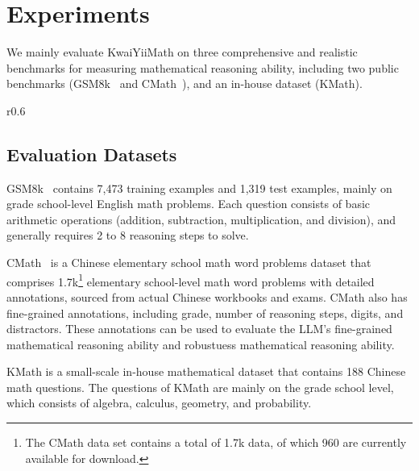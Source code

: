 \documentclass{article}
\begin{document}
\section{Experiments}
We mainly evaluate KwaiYiiMath on three comprehensive and realistic benchmarks for measuring mathematical reasoning ability, including two public benchmarks (GSM8k~\cite{cobbe2021training} and CMath~\cite{wei2023cmath}), and an in-house dataset (KMath).


\begin{wraptable}{r}{0.6\linewidth}
\centering
\vspace{-1.0em}
\caption{Results on our Chinese and English test set of human preference benchmarks. }
\label{table:rm}
\vspace{-0.7em}
\end{wraptable}
\subsection{Evaluation Datasets}
GSM8k~\cite{cobbe2021training} contains 7,473 training examples and 1,319 test examples, mainly on grade school-level English math problems. Each question consists of basic arithmetic operations (addition, subtraction, multiplication, and division), and generally requires 2 to 8 reasoning steps to solve. 

CMath~\cite{wei2023cmath} is a Chinese elementary school math word problems dataset that comprises 1.7k\footnote{The CMath data set contains a total of 1.7k data, of which 960 are currently available for download.} elementary school-level math word problems with detailed annotations, sourced from actual Chinese workbooks and exams. 
CMath also has fine-grained annotations, including grade, number of reasoning steps, digits, and distractors.
These annotations can be used to evaluate the LLM's fine-grained mathematical reasoning ability and robustuess mathematical reasoning ability.

KMath is a small-scale in-house mathematical dataset that contains 188 Chinese math questions.
The questions of KMath are mainly on the grade school level, which consists of algebra, calculus, geometry, and probability.
\end{document}
